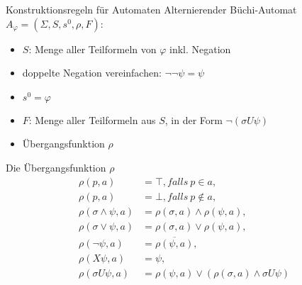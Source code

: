 \begin{frame}{\insertsubsection}
\begin{block}{Konstruktionsregeln für Automaten}
Alternierender Büchi-Automat $A_\varphi = (\Sigma, S, s^0, \rho, F)$:
\vspace*{1em}
    \begin{itemize}
        \setlength\itemsep{1em}
        \item $S$: Menge aller Teilformeln von $\varphi$ inkl. Negation
        \item doppelte Negation vereinfachen: $\lnot\lnot\psi = \psi$
        \item $s^0 = \varphi$
        \item $F$: Menge aller Teilformeln aus $S$, in der Form $\lnot(\sigma U\psi)$
        \item Übergangsfunktion $\rho$
    \end{itemize}
\end{block}
\end{frame}

\begin{frame}{\insertsubsection}
\begin{block}{Die Übergangsfunktion $\rho$}
    \vspace*{-1em}
    \begin{equation*}
    \label{aba-zu-ltl:transitionsfunktion}
    \begin{split}
        \rho(p, a) &= \top, falls \ p \in a,\\
        \rho(p, a) &= \bot, falls \ p \not\in a,\\
        \rho(\sigma \land \psi, a) &= \rho(\sigma, a) \land \rho(\psi, a),\\
        \rho(\sigma \lor \psi, a) &= \rho(\sigma, a) \lor \rho(\psi, a),\\
        \rho(\lnot\psi, a) &= \overline{\rho(\psi, a)},\\
        \rho(X\psi, a) &= \psi,\\
        \rho(\sigma U\psi, a) &= \rho(\psi, a) \lor (\rho(\sigma, a) \land \sigma U\psi)
    \end{split}
    \end{equation*}
\end{block}
\end{frame}

